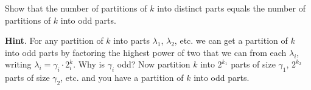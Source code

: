 \documentclass{book}
\begin{document}
\setcounter{cpjt}{314}
\addtocounter{cpjt}{-1}
\begin{activity}\label{activity-307}
\hypertarget{p-1551}{}%
Show that the number of partitions of \(k\) into distinct parts equals the number of partitions of \(k\) into odd parts.%
\par\smallskip%
\noindent\textbf{Hint}.\hypertarget{hint-202}{}\quad%
\hypertarget{p-1552}{}%
For any partition of \(k\) into parts \(\lambda_1\), \(\lambda_2\), etc. we can get a partition of \(k\) into odd parts by factoring the highest power of two that we can from each \(\lambda_i\), writing \(\lambda_i = \gamma_i\cdot 2^k_i\).  Why is \(\gamma_i\) odd? Now partition \(k\) into \(2^{k_1}\) parts of size \(\gamma_1\), \(2^{k_2}\) parts of size \(\gamma_2\), etc. and you have a partition of \(k\) into odd parts.%
\par\smallskip%
\noindent\end{activity}

\clearpage
\end{document}

